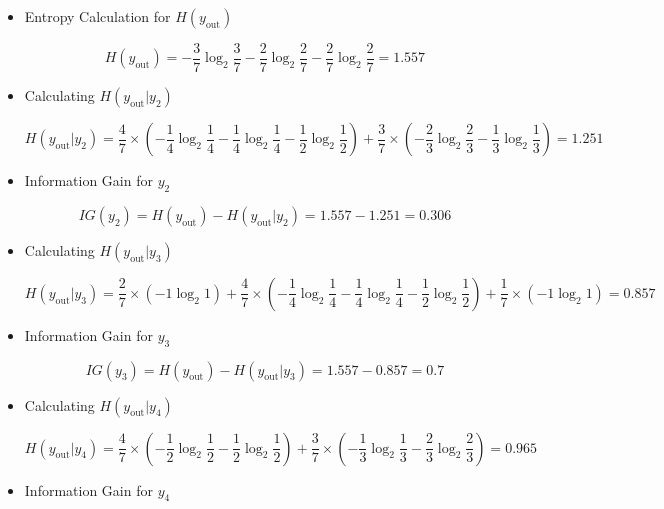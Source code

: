 \documentclass[12pt]{article}
\begin{document}
\begin{enumerate}[leftmargin=\labelsep, label=\textbf{\arabic*.)}]
\begin{itemize}
              \item Entropy Calculation for \( H(y_{\text{out}}) \)

                    \[
                        H(y_{\text{out}}) = -\frac{3}{7} \log_2 \frac{3}{7} - \frac{2}{7} \log_2 \frac{2}{7} - \frac{2}{7} \log_2 \frac{2}{7} = 1.557
                    \]

              \item Calculating \( H(y_{\text{out}}|y_2) \)

                    \[
                        H(y_{\text{out}}|y_2) = \frac{4}{7} \times \left( -\frac{1}{4} \log_2 \frac{1}{4} -\frac{1}{4} \log_2 \frac{1}{4} -\frac{1}{2} \log_2 \frac{1}{2}\right) + \frac{3}{7} \times \left( -\frac{2}{3} \log_2 \frac{2}{3} - \frac{1}{3} \log_2 \frac{1}{3} \right) = 1.251
                    \]

              \item Information Gain for \( y_2 \)

                    \[
                        IG(y_2) = H(y_{\text{out}}) - H(y_{\text{out}}|y_2) = 1.557 - 1.251 = 0.306
                    \]

              \item Calculating \( H(y_{\text{out}}|y_3) \)

                    \[
                        H(y_{\text{out}}|y_3) = \frac{2}{7} \times \left( -1 \log_2 1 \right) + \frac{4}{7} \times \left( -\frac{1}{4} \log_2 \frac{1}{4} -\frac{1}{4} \log_2 \frac{1}{4} - \frac{1}{2} \log_2 \frac{1}{2} \right) + \frac{1}{7} \times \left( -1 \log_2 1 \right) = 0.857
                    \]

              \item Information Gain for \( y_3 \)

                    \[
                        IG(y_3) = H(y_{\text{out}}) - H(y_{\text{out}}|y_3) = 1.557 - 0.857 = 0.7
                    \]

              \item Calculating \( H(y_{\text{out}}|y_4) \)

                    \[
                        H(y_{\text{out}}|y_4) = \frac{4}{7} \times \left( -\frac{1}{2} \log_2 \frac{1}{2} - \frac{1}{2} \log_2 \frac{1}{2} \right) + \frac{3}{7} \times \left( -\frac{1}{3} \log_2 \frac{1}{3} - \frac{2}{3} \log_2 \frac{2}{3} \right) = 0.965
                    \]

              \item Information Gain for \( y_4 \)


\end{itemize}
\end{enumerate}
\end{document}
